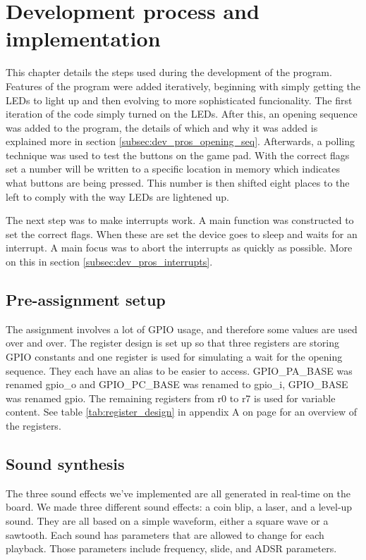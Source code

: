 \section{Development process and implementation}
\label{chap:development_process}

This chapter details the steps used during the development of the program. Features of the program were added iteratively, beginning with simply getting the LEDs to light up and then evolving to more sophisticated funcionality. The first iteration of the code simply turned on the LEDs. After this, an opening sequence was added to the program, the details of which and why it was added is explained more in section \ref{subsec:dev_pros_opening_seq}. Afterwards, a polling technique was used to test the buttons on the game pad. With the correct flags set a number will be written to a specific location in memory which indicates what buttons are being pressed. This number is then shifted eight places to the left to comply with the way LEDs are lightened up.

The next step was to make interrupts work. A main function was constructed to set the correct flags. When these are set the device goes to sleep and waits for an interrupt. A main focus was to abort the interrupts as quickly as possible. More on this in section \ref{subsec:dev_pros_interrupts}.

\subsection{Pre-assignment setup}
\label{subsec:pre-assingment_setup}

The assignment involves a lot of GPIO usage, and therefore some values are used over and over. The register design is set up so that three registers are storing GPIO constants and one register is used for simulating a wait for the opening sequence. They each have an alias to be easier to access. GPIO\_PA\_BASE was renamed gpio\_o and GPIO\_PC\_BASE was renamed to gpio\_i, GPIO\_BASE was renamed gpio. The remaining registers from r0 to r7 is used for variable content. See table \ref{tab:register_design} in appendix A on page \pageref{tab:register_design} for an overview of the registers.

\subsection{Sound synthesis}
The three sound effects we've implemented are all generated in real-time on the board.
We made three different sound effects: a coin blip, a laser, and a level-up sound.
They are all based on a simple waveform, either a square wave or a sawtooth.
Each sound has parameters that are allowed to change for each playback.
Those parameters include frequency, slide, and ADSR parameters.

